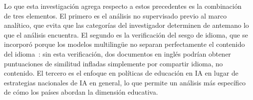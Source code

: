 Lo que esta investigación agrega respecto a estos precedentes es la combinación de tres elementos. El primero es el análisis no supervisado previo al marco analítico, que evita que las categorías del investigador determinen de antemano lo que el análisis encuentra. El segundo es la verificación del sesgo de idioma, que se incorporó porque los modelos multilingüe no separan perfectamente el contenido del idioma~\citep{conneau2020unsupervised}: sin esta verificación, dos documentos en inglés podrían obtener puntuaciones de similitud infladas simplemente por compartir idioma, no contenido. El tercero es el enfoque en políticas de educación en IA en lugar de estrategias nacionales de IA en general, lo que permite un análisis más específico de cómo los países abordan la dimensión educativa.
